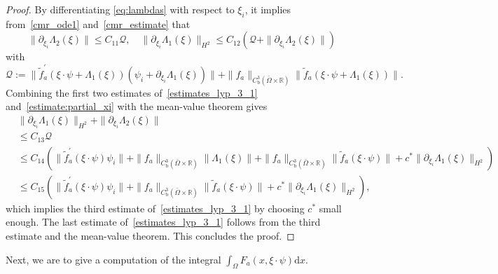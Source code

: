 \documentclass{elsarticle}
\begin{document}
\begin{proof}
By differentiating \eqref{eq:lambdas} with respect to $\xi_i$, it implies from~\eqref{cmr_ode1} and~\eqref{cmr_estimate} that
\begin{equation} \label{estimate:partial_xi}
	\|\partial_{\xi_i} \Lambda_2(\xi)\|\leqslant C_{11}\mathcal{Q}, \quad \|\partial_{\xi_i} \Lambda_1(\xi)\|_{H^2} \leqslant C_{12}\left( \mathcal{Q} + \|\partial_{\xi_i} \Lambda_2(\xi)\|\right)
\end{equation}
with
\begin{equation*}
	\mathcal{Q}:= \|\tilde{f}^{\prime}_a(\xi\cdot\psi + \Lambda_1(\xi))(\psi_i + \partial_{\xi_i}\Lambda_1(\xi))\| +\|f_a\|_{C^3_{\mathrm{b}}(\bar{\Omega}\times\mathbb{R})}\|\tilde{f}_a(\xi\cdot\psi + \Lambda_1(\xi))\|.
\end{equation*}
Combining the first two estimates of~\eqref{estimates_lyp_3_1} and~\eqref{estimate:partial_xi} with the mean-value theorem gives 
\begin{equation*}
\begin{split}
	&\|\partial_{\xi_i} \Lambda_1(\xi)\|_{H^2} + \|\partial_{\xi_i} \Lambda_2(\xi)\| \\
	&\leqslant C_{13}\mathcal{Q} \\
	&\leqslant C_{14}\left(\|\tilde{f}^{\prime}_a(\xi\cdot\psi)\psi_i \| + \|f_a\|_{C^3_{\mathrm{b}}(\bar{\Omega}\times\mathbb{R})}\|\Lambda_1(\xi)\| + \|f_a\|_{C^3_{\mathrm{b}}(\bar{\Omega}\times\mathbb{R})}\|\tilde{f}_a(\xi\cdot\psi)\| + c^\ast\|\partial_{\xi_i} \Lambda_1(\xi)\|_{H^2} \right)\\
	&\leqslant C_{15}\left(\|\tilde{f}^{\prime}_a(\xi\cdot\psi)\psi_i \| + \|f_a\|_{C^3_{\mathrm{b}}(\bar{\Omega}\times\mathbb{R})}\|\tilde{f}_a(\xi\cdot\psi)\| + c^\ast\|\partial_{\xi_i} \Lambda_1(\xi)\|_{H^2} \right),
\end{split}
\end{equation*}
which implies the third estimate of~\eqref{estimates_lyp_3_1} by choosing $c^\ast$ small enough. The last estimate of~\eqref{estimates_lyp_3_1} follows from the third estimate and the mean-value theorem. This concludes the proof.
\end{proof}

Next, we are to give a computation of the integral $\int_{\Omega}F_a(x, \xi\cdot\psi)\mathrm{d}x $.
\end{document}
